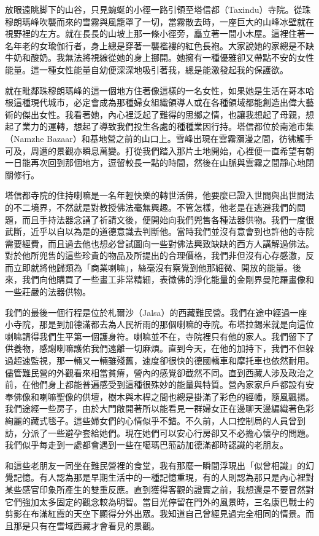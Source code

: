 放眼遠眺脚下的山谷，只見蜿蜒的小徑一路引領至塔信都（Taxindu）寺院。從珠穆朗瑪峰吹襲而來的雪霧與風籠罩了一切，當霧散去時，一座巨大的山峰冰壁就在視野裡的左方。就在長長的山坡上那一條小徑旁，矗立著一間小木屋。這裡住著一名年老的女瑜伽行者，身上總是穿著一襲襤褸的紅色長袍。大家說她的家總是不缺牛奶和酸奶。我無法將視線從她的身上挪開。她擁有一種優雅卻又帶點不安的女性能量。這一種女性能量自幼便深深地吸引著我，總是能激發起我的保護欲。

就在毗鄰珠穆朗瑪峰的這一個地方住著像這樣的一名女性，如果她是生活在哥本哈根這種現代城市，必定會成為那種婦女組織領導人或在各種領域都能創造出偉大藝術的傑出女性。我看著她，內心裡泛起了難得的思鄉之情，也讓我想起了母親，想起了業力的運轉，想起了導致我們投生各處的種種業因行持。塔信都位於南池市集（Namzhe
Bazaar）和基地營之前的山口上。雪峰出現在雲霧瀰漫之間，彷彿觸手可及，周遭的景觀亦瞬息萬變。打從我們踏入那片土地開始，心裡便一直希望有朝一日能再次回到那個地方，逗留較長一點的時間，然後在山脈與雲霧之間靜心地閉關修行。

塔信都寺院的住持喇嘛是一名年輕快樂的轉世活佛，他要麼已證入世間與出世間法的不二境界，不然就是對教授佛法毫無興趣。不管怎樣，他老是在逃避我們的問題，而且手持法器念誦了祈請文後，便開始向我們兜售各種法器供物。我們一度很武斷，近乎以自以為是的道德意識去判斷他。當時我們並沒有意會到也許他的寺院需要經費，而且過去他也想必曾試圖向一些對佛法興致缺缺的西方人講解過佛法。對於他所兜售的這些珍貴的物品及所提出的合理價格，我們非但沒有心存感激，反而立即就將他歸類為「商業喇嘛」，絲毫沒有察覺到他那細微、開放的能量。後來，我們向他購買了一些畫工非常精細，表徵佛的淨化能量的金剛界曼陀羅畫像和一些莊嚴的法器供物。

我們的最後一個行程是位於札爾沙（Jalsa）的西藏難民營。我們在途中經過一座小寺院，那是到加德滿都去為人民祈雨的那個喇嘛的寺院。布塔拉錫米就是向這位喇嘛請得我們生平第一個護身符。喇嘛並不在，寺院裡只有他的家人。我們留下了供養物，感謝喇嘛護佑我們遠離一切麻煩。直到今天，在他的加持下，我們不但躲過超速監視，那一輛又一輛雖殘舊，速度卻很快的德國轎車和摩托車也依然耐用。儘管難民營的外觀看來相當貧瘠，營內的感覺卻截然不同。直到西藏人涉及政治之前，在他們身上都能普遍感受到這種很殊妙的能量與特質。營內家家戶戶都設有安奉佛像和喇嘛聖像的供壇，樹木與木桿之間也總是掛滿了彩色的經幡，隨風飄揚。我們途經一些房子，由於大門敞開著所以能看見一群婦女正在邊聊天邊編織著色彩絢麗的藏式毯子。這些婦女們的心情似乎不錯。不久前，人口控制局的人員曾到訪，分派了一些避孕套給她們。現在她們可以安心行房卻又不必擔心懷孕的問題。我們似乎每走到一處都會遇到一些在噶瑪巴蒞訪加德滿都時認識的老朋友。

和這些老朋友一同坐在難民營裡的食堂，我有那麼一瞬間浮現出「似曾相識」的幻覺記憶。有人認為那是早期生活中的一種記憶重現，有的人則認為那只是內心裡對某些感官印象所產生的雙重反應。直到獲得客觀的證實之前，我想還是不要冒然對它們強加太多固定的觀念較為明智。當目光停留在門外的風景時，三名康巴戰士的剪影在布滿紅霞的天空下顯得分外出眾。我知道自己曾經見過完全相同的情景。而且那是只有在雪域西藏才會看見的景觀。

